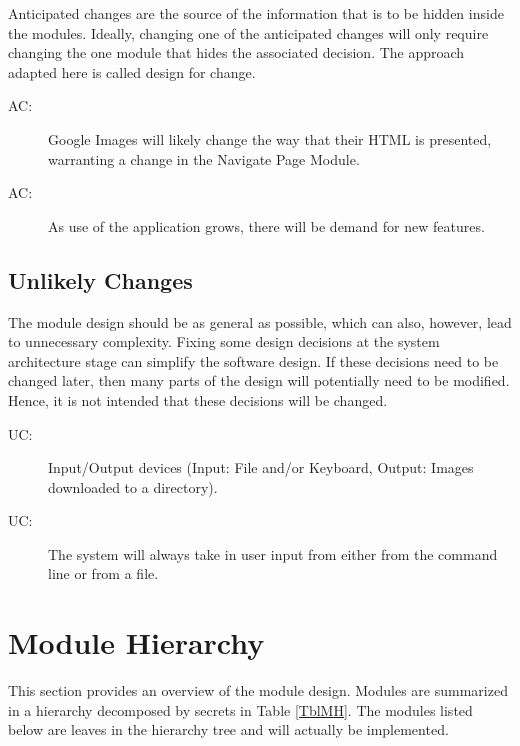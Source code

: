 \documentclass[12pt, titlepage]{article}
\newcounter{acnum}
\newcommand{\actheacnum}{AC\theacnum}
\newcounter{ucnum}
\newcommand{\uctheucnum}{UC\theucnum}
\begin{document}
Anticipated changes are the source of the information that is to be hidden
inside the modules. Ideally, changing one of the anticipated changes will only
require changing the one module that hides the associated decision. The approach
adapted here is called design for change.

\begin{description}
\item[ \actheacnum \label{acHTML}:] Google Images will likely change the way that their HTML is presented, warranting a change in the Navigate Page Module.
\item[ \actheacnum \label{acInput}:] As use of the application grows, there will be demand for new features.
\end{description}

\subsection{Unlikely Changes} \label{SecUchange}

The module design should be as general as possible, which can also, however, 
lead to unnecessary complexity. Fixing some design decisions at the system 
architecture stage can simplify the software design. If
these decisions need to be changed later, then many parts of the design
will potentially need to be modified. Hence, it is not intended that these
decisions will be changed.

\begin{description}
\item[ \uctheucnum \label{ucIO}:] Input/Output devices
  (Input: File and/or Keyboard, Output: Images downloaded to a directory).
\item[ \uctheucnum \label{ucInput}:] The system will always take in user input from either from the command line or from a file.
\end{description}

\newpage

\section{Module Hierarchy} \label{SecMH}

This section provides an overview of the module design. Modules are summarized
in a hierarchy decomposed by secrets in Table \ref{TblMH}. The modules listed
below are leaves in the hierarchy tree and will actually be implemented.
\end{document}
